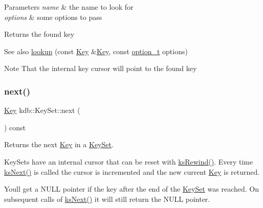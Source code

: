 \begin{DoxyParams}{Parameters}
{\em name} & the name to look for \\
\hline
{\em options} & some options to pass\\
\hline
\end{DoxyParams}
\begin{DoxyReturn}{Returns}
the found key 
\end{DoxyReturn}
\begin{DoxySeeAlso}{See also}
\hyperlink{classkdb_1_1KeySet_a78125fb19c6aebb0d8fc1a7238b78ace}{lookup} (const \hyperlink{classkdb_1_1Key}{Key} \&\hyperlink{group__key}{Key}, const \hyperlink{group__keyset_ga98a3d6a4016c9dad9cbd1a99a9c2a45a}{option\+\_\+t} options)
\end{DoxySeeAlso}
\begin{DoxyNote}{Note}
That the internal key cursor will point to the found key 
\end{DoxyNote}
\mbox{\label{classkdb_1_1KeySet_affd52d130faf184361297f9e7f0c9f16}} 
\subsubsection{\texorpdfstring{next()}{next()}}
{\footnotesize\ttfamily \hyperlink{classkdb_1_1Key}{Key} kdb\+::\+Key\+Set\+::next (\begin{DoxyParamCaption}{ }\end{DoxyParamCaption}) const\hspace{0.3cm}{\ttfamily [inline]}}



Returns the next \hyperlink{classkdb_1_1Key}{Key} in a \hyperlink{classkdb_1_1KeySet}{Key\+Set}. 

Key\+Sets have an internal cursor that can be reset with \hyperlink{group__keyset_gabe793ff51f1728e3429c84a8a9086b70}{ks\+Rewind()}. Every time \hyperlink{group__keyset_ga317321c9065b5a4b3e33fe1c399bcec9}{ks\+Next()} is called the cursor is incremented and the new current \hyperlink{classkdb_1_1Key}{Key} is returned.

You\textquotesingle{}ll get a N\+U\+LL pointer if the key after the end of the \hyperlink{classkdb_1_1KeySet}{Key\+Set} was reached. On subsequent calls of \hyperlink{group__keyset_ga317321c9065b5a4b3e33fe1c399bcec9}{ks\+Next()} it will still return the N\+U\+LL pointer.

